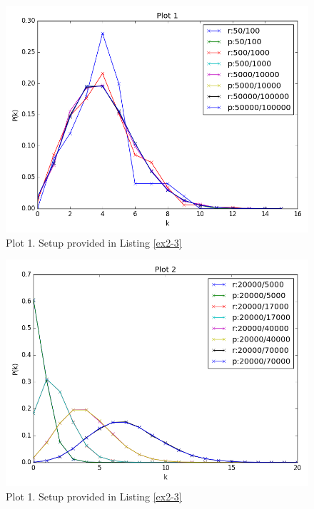 \documentclass[10pt,a4paper]{article}
\begin{document}
\begin{enumerate}
\begin{figure}[!h]
  \includegraphics[width=\linewidth]{Plot_1.png}
  \caption{Plot 1. Setup provided in Listing \ref{ex2-3}}
  \label{ex2-p1}
\end{figure}
\begin{figure}[h]
  \includegraphics[width=\linewidth]{Plot_2.png}
  \caption{Plot 1. Setup provided in Listing \ref{ex2-3}}
  \label{ex2-p2}
\end{figure}


\end{enumerate}
\end{document}
